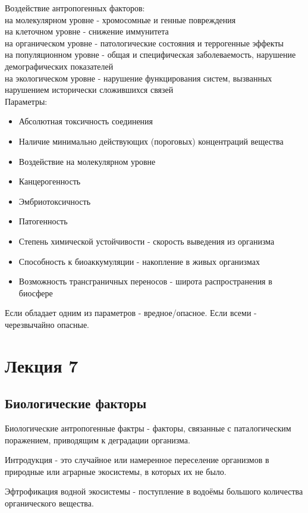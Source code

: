 Воздействие антропогенных факторов:\\
на молекулярном уровне - хромосомные и генные повреждения\\
на клеточном уровне - снижение иммунитета\\
на органическом уровне - патологические состояния и террогенные эффекты\\
на популяционном уровне - общая и специфическая заболеваемость, нарушение демографических показателей\\
на экологическом уровне - нарушение функцирования систем, вызванных нарушением исторически сложившихся связей\\

Параметры:
\begin{itemize}
\item Абсолютная токсичность соединения
\item Наличие минимально действующих (пороговых) концентраций вещества
\item Воздействие на молекулярном уровне
\item Канцерогенность
\item Эмбриотоксичность
\item Патогенность
\item Степень химической устойчивости - скорость выведения из организма
\item Способность к биоаккумуляции - накопление в живых организмах
\item Возможность трансграничных переносов - широта распространения в биосфере
\end{itemize}
Если обладает одним из параметров - вредное/опасное. Если всеми - черезвычайно опасные.

\chapter{Лекция 7}
\section{Биологические факторы}
Биологические антропогенные фактры - факторы, связанные с паталогическим поражением, приводящим к деградации организма.

Интродукция - это случайное или намеренное переселение организмов в природные или аграрные экосистемы, в которых их не было.

Эфтрофикация водной экосистемы - поступление в водоёмы большого количества органического вещества.


